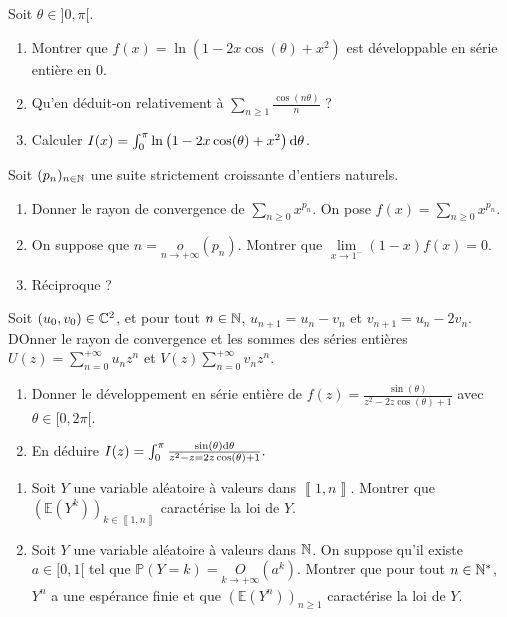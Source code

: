 \documentclass[12pt]{article}
\begin{document}
\begin{exercise}
    Soit $\theta\in]0,\pi[$.
    \begin{enumerate}
        \item Montrer que $f(x)=\ln\left(1-2x\cos(\theta)+x^{2}\right)$ est développable en série entière en 0.
        \item Qu'en déduit-on relativement à $\sum_{n\geqslant1}\frac{\cos(n\theta)}{n}$ ?
        \item Calculer $I(x)=\int_{0}^{\pi}\ln\left(1-2x\cos(\theta)+x^{2}\right)\mathrm{d}\theta$.
    \end{enumerate}
\end{exercise}

\begin{exercise}
    Soit $(p_n)_{n\in\mathbb{N}}$ une suite strictement croissante d'entiers naturels.
    \begin{enumerate}
        \item Donner le rayon de convergence de $\sum_{n\geqslant0}x^{p_n}$. On pose $f(x)=\sum_{n\geqslant0}x^{p_n}$.
        \item On suppose que $n=\underset{n\to+\infty}{o}(p_n)$. Montrer que $\lim\limits_{x\to1^{-}}(1-x)f(x)=0$.
        \item Réciproque ? %
    \end{enumerate}
\end{exercise}

\begin{exercise}
    Soit $(u_0,v_0)\in\mathbb{C}^{2}$, et pour tout $n\in\mathbb{N}$, $u_{n+1}=u_n-v_n$ et $v_{n+1}=u_n-2v_n$. DOnner le rayon de convergence et les sommes des séries entières $U(z)=\sum_{n=0}^{+\infty}u_nz^{n}$ et $V(z)\sum_{n=0}^{+\infty}v_nz^{n}$.
\end{exercise}

\begin{exercise}
    \phantom{}
    \begin{enumerate}
        \item Donner le développement en série entière de $f(z)=\frac{\sin(\theta)}{z^{2}-2z\cos(\theta)+1}$ avec $\theta\in[0,2\pi[$.
        \item En déduire $I(z)=\int_{0}^{\pi}\frac{\sin(\theta)\mathrm{d}\theta}{z^{2}-z=2z\cos(\theta)+1}.$
    \end{enumerate}
\end{exercise}

\begin{exercise}
    \phantom{}
    \begin{enumerate}
        \item Soit $Y$ une variable aléatoire à valeurs dans $\left\llbracket1,n\right\rrbracket$. Montrer que $\left(\mathbb{E}\left(Y^{k}\right)\right)_{k\in\left\llbracket1,n\right\rrbracket}$ caractérise la loi de $Y$.
        \item Soit $Y$ une variable aléatoire à valeurs dans $\mathbb{N}$. On suppose qu'il existe $a\in[0,1[$ tel que $\mathbb{P}\left(Y=k\right)=\underset{k\to+\infty}{O}(a^{k})$. Montrer que pour tout $n\in\mathbb{N}^{*}$, $Y^{n}$ a une espérance finie et que $\left(\mathbb{E}(Y^{n})\right)_{n\geqslant1}$ caractérise la loi de $Y$.
    \end{enumerate}
\end{exercise}
\end{document}
